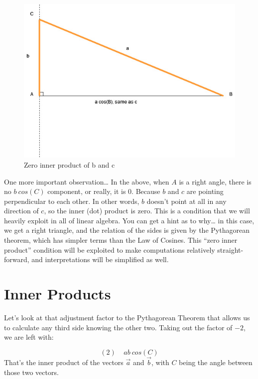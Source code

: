 \documentclass[
]{book}
\begin{document}
\begin{figure}

{\centering \includegraphics[width=0.75\linewidth,height=0.75\textheight]{images/Triangles-bcosA-rightTriangle} 

}

\caption{Zero inner product of b and c}\label{fig:unnamed-chunk-14}
\end{figure}

One more important observation\ldots{} In the above, when \(A\) is a right angle, there is no \(b\ cos(C)\) component, or really, it is 0. Because \(b\) and \(c\) are pointing perpendicular to each other. In other words, \(b\) doesn't point at all in any direction of \(c\), so the inner (dot) product is zero. This is a condition that we will heavily exploit in all of linear algebra. You can get a hint as to why\ldots{} in this case, we get a right triangle, and the relation of the sides is given by the Pythagorean theorem, which has simpler terms than the Law of Cosines. This ``zero inner product'' condition will be exploited to make computations relatively straight-forward, and interpretations will be simplified as well.

\hypertarget{inner-products}{%
\section{Inner Products}\label{inner-products}}

Let's look at that adjustment factor to the Pythagorean Theorem that allows us to calculate any third side knowing the other two. Taking out the factor of \(-2\), we are left with:

\[(2) \ \ \ \ \ a b \ cos(C)\]
That's the inner product of the vectors \(\vec{a}\) and \(\vec{b}\), with \(C\) being the angle between those two vectors.
\end{document}
